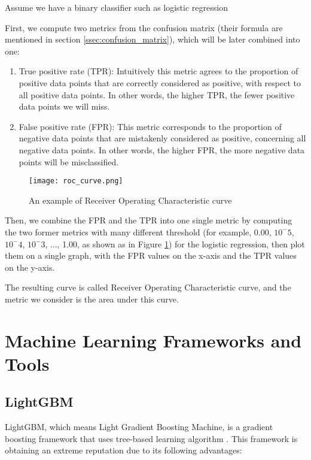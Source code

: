 Assume we have a binary classifier such as logistic regression

First, we compute two metrics from the confusion matrix (their formula are mentioned in section \ref{ssec:confusion_matrix}), which will be later combined into one:

\begin{enumerate}
    \item True positive rate (TPR): Intuitively this metric agrees to the proportion of positive data points that are correctly considered as positive, with respect to all positive data points. In other words, the higher TPR, the fewer positive data points we will miss.
    \item False positive rate (FPR): This metric corresponds to the proportion of negative data points that are mistakenly considered as positive, concerning all negative data points. In other words, the higher FPR, the more negative data points will be misclassified.
\end{enumerate}

\begin{figure}[H]
    \centering    
    \texttt{[image: roc\_curve.png]}
    \caption{An example of Receiver Operating Characteristic curve}
    \label{fig:auroc}
\end{figure}

Then, we combine the FPR and the TPR into one single metric by computing the two former metrics with many different threshold (for example, 0.00, $10^-5$, $10^-4$, $10^-3$, ..., 1.00, as shown as in Figure \ref{fig:auroc}) for the logistic regression, then plot them on a single graph, with the FPR values on the x-axis and the TPR values on the y-axis. 

The resulting curve is called  Receiver Operating Characteristic curve, and the metric we consider is the area under this curve.

\section{Machine Learning Frameworks and Tools}

\subsection{LightGBM}

LightGBM, which means Light Gradient Boosting Machine, is a gradient boosting framework that uses tree-based learning algorithm \cite{ke2017lightgbm}. This framework is obtaining an extreme reputation due to its following advantages:

